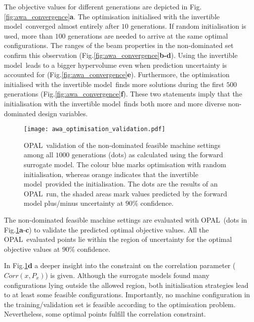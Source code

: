 \documentclass[a4paper, 12pt, version-1-compatibility]{article}
\def\invertiblemodel{invertible model}
\def\opal{OPAL}
\def\dvars{design variables}
\newcommand{\figref}[1]{Fig.\xspace\ref{#1}}
\begin{document}
The objective values for different generations are depicted in \figref{fig:awa_convergence}\textbf{a}. The optimisation initialised with the \invertiblemodel\  converged almost entirely after $10$ generations. If random initialisation is used, more than $100$ generations are needed to arrive at the same optimal configurations. The  ranges of the beam properties in the non-dominated set confirm this observation (\figref{fig:awa_convergence}\textbf{b-d}). Using the \invertiblemodel\ leads to a bigger hypervolume even when prediction uncertainty is accounted for (\figref{fig:awa_convergence}\textbf{e}). Furthermore, the optimisation initialised with the \invertiblemodel\ finds more solutions during the first $500$ generations (\figref{fig:awa_convergence}\textbf{f}). These two statements imply that the initialisation with the \invertiblemodel\ finds both more and more diverse non-dominated \dvars. 


\begin{figure}
    \centering
    \texttt{[image: awa\_optimisation\_validation.pdf]}
    \caption{\opal\ validation of the non-dominated feasible machine settings among all $1000$ generations (dots) as calculated using the forward surrogate model. The colour blue marks optimisation with random initialisation, whereas orange indicates that the \invertiblemodel\ provided the initialisation. The dots are the results of an \opal\ run, the shaded areas mark values predicted by the forward model plus/minus uncertainty at $90\%$ confidence.}
    \label{fig:awa_validation}
\end{figure}


The non-dominated feasible machine settings are evaluated with \opal\ (dots in \figref{fig:awa_validation}\textbf{a}-\textbf{c}) to validate the predicted optimal objective values. All the \opal\ evaluated points lie within the region of uncertainty for the optimal objective values at $90\%$ confidence. 

In \figref{fig:awa_validation}\textbf{d} a deeper insight into the constraint on the correlation parameter ($Corr(x,P_x)$) is given. Although the surrogate models found many configurations lying outside the allowed region, both initialisation strategies lead to at least some feasible configurations. Importantly, no machine configuration in the training/validation set is feasible according to the optimisation problem. Nevertheless, some optimal points fulfill the correlation constraint. 
\end{document}
